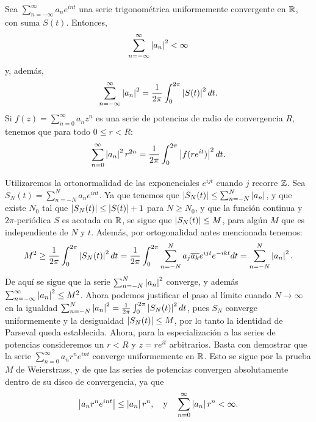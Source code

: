 \begin{theo}[Parseval]\label{teo-identidad-Parseval}
    Sea \(\sum_{n=-\infty}^{\infty}a_ne^{int}\) una serie trigonométrica uniformemente convergente en \(\mathbb{R}\), con suma
    \(S(t)\). Entonces,
    \[
    \sum_{n=-\infty}^{\infty} \left\lvert a_n\right\rvert^2 < \infty
    \]
    y, además,
    \[
    \sum_{n=-\infty}^{\infty} \left\lvert a_n\right\rvert^2 = \frac{1}{2\pi} \int_{0}^{2\pi} \left\lvert S(t)\right\rvert^2 dt.
    \]
    Si \(f(z) = \sum_{n=0}^{\infty}a_nz^{n}\) es una serie de potencias de radio de convergencia \(R\), tenemos que 
    para todo \(0\leq r < R\):
    \[
    \sum_{n=0}^{\infty}\left\lvert a_n\right\rvert^2 r^{2n} = \frac{1}{2\pi} \int_{0}^{2\pi} \left\lvert f(re^{it})\right\rvert^2 dt.
    \]
\end{theo}
\begin{dem}
    Utilizaremos la ortonormalidad de las exponenciales \(e^{ijt}\) cuando \(j\) recorre \(\mathbb{Z}\). Sea \(S_N(t) = \sum_{n=-N}^{N}a_n e^{int}\).
    Ya que tenemos que \(\left\lvert S_N(t)\right\rvert \leq \sum_{n=-N}^{N}\left\lvert a_n\right\rvert\), y que existe \(N_0\) tal que \(\left\lvert S_N(t)\right\rvert\leq \left\lvert S(t)\right\rvert + 1\) para 
    \(N\geq N_0\), y que la función continua y \(2\pi\)-periódica \(S\) es acotada en \(\mathbb{R}\), se sigue que \(\left\lvert S_N(t)\right\rvert \leq M\), para algún 
    \(M\) que es independiente de \(N\) y \(t\). Además, por ortogonalidad antes mencionada tenemos:
    \[
    M^2 \geq \frac{1}{2\pi}\int_{0}^{2\pi} \left\lvert S_N(t)\right\rvert^2 dt = \frac{1}{2\pi} \int_{0}^{2\pi}\sum_{n=-N}^{N} a_j \overline{a_k} e^{ijt}e^{-ikt} dt 
    = \sum_{n=-N}^{N} \left\lvert a_n\right\rvert^2.
    \]
    De aquí se sigue que la serie \(\sum_{n=-N}^{N}\left\lvert a_n\right\rvert^2\) converge, y además \(\sum_{n=-\infty}^{\infty}\left\lvert a_n\right\rvert^2 \leq M^2 \). Ahora 
    podemos justificar el paso al límite cuando \(N \to \infty\) en la igualdad 
    \(\sum_{n=-N}^{N} \left\lvert a_n\right\rvert^2 = \frac{1}{2\pi}\int_{0}^{2\pi} \left\lvert S_N(t)\right\rvert^2 dt\), pues \(S_N\) converge uniformemente y la desigualdad 
    \(\left\lvert S_N(t)\right\rvert\leq M\), por lo tanto la identidad de Parseval queda establecida. Ahora, para la especialización a las series de potencias
    consideremos un \(r<R\) y \(z = re^{it}\) arbitrarios. Basta con demostrar que la serie \(\sum_{n=0}^{\infty}a_nr^ne^{int}\) converge 
    uniformemente en \(\mathbb{R}\). Esto se sigue por la prueba \(M\) de Weierstrass, y de que las series de potencias convergen absolutamente dentro 
    de su disco de convergencia, ya que
    \[
    \left\lvert a_nr^n e^{int}\right\rvert \leq \left\lvert a_n\right\rvert r^n, \quad \text{y}\quad \sum_{n=0}^{\infty} \left\lvert a_n\right\rvert r^n < \infty.
    \]

\end{dem}

